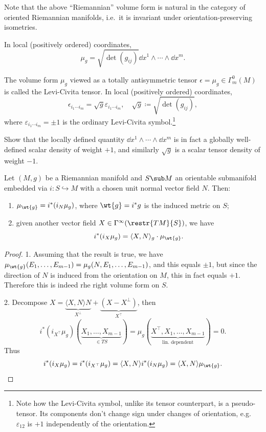 Note that the above ``Riemannian'' volume form is natural in the category of oriented Riemannian manifolds, i.e.\ it is invariant under orientation-preserving isometries.

In local (positively ordered) coordinates, \[\mu_g=\sqrt{\det(g_{ij})}\dd x^1\wedge\cdots\wedge \dd x^m.\]

\begin{defn}
    The volume form $\mu_g$ viewed as a totally antisymmetric tensor $\epsilon=\mu_g\in\Gamma^0_m(M)$ is called the Levi-Civita tensor. In local (positively ordered) coordinates,
    \[\epsilon_{i_1\cdots i_m}=\sqrt g\varepsilon_{i_1\cdots i_m},\quad \sqrt g\coloneqq\sqrt{\det(g_{ij})},\]
    where $\varepsilon_{i_1\cdots i_m}=\pm 1$ is the ordinary Levi-Civita symbol.\footnote{Note how the Levi-Civita symbol, unlike its tensor counterpart, is a pseudo-tensor. Its components don't change sign under changes of orientation, e.g. $\varepsilon_{12}$ is $+1$ independently of the orientation.}
\end{defn}

\begin{xca}
    Show that the locally defined quantity $\dd x^1\wedge\cdots \wedge\dd x^m$ is in fact a globally well-defined scalar density of weight $+1$, and similarly  $\sqrt{g}$ is a scalar tensor density of weight $-1$.
\end{xca}

\begin{prop}
    Let $(M,g)$ be a Riemannian manifold and $S\sub M$ an orientable submanifold embedded via $i:S\hookrightarrow M$ with a chosen unit normal vector field $N$. Then:
    \begin{enumerate}
        \item $\mu_{\wt{g}}=i^\ast (i_N \mu_g)$, where $\wt{g}=i^\ast g$ is the induced metric on $S$;
        \item given another vector field $X\in\Gamma^\infty(\restr{TM}{S})$, we have 
        \[i^\ast(i_X\mu_g)=\langle X,N\rangle_g \cdot \mu_{\wt{g}}.\]
    \end{enumerate}
\end{prop}
\begin{proof}
        1. Assuming that the result is true, we have $\mu_{\wt{g}}(E_1,\ldots,E_{m-1})=\mu_g(N,E_1,\ldots,E_{m-1})$, and this equals $\pm 1$, but since the direction of $N$ is induced from the orientation on $M$, this in fact equals $+1$. Therefore this is indeed rhe right volume form on $S$.
        
        2. Decompose $X=\underbrace{\langle X,N\rangle N}_{X^\perp}+\underbrace{(X-X^\perp)}_{X^\top}$,
        then 
        \[i^\ast(i_{X^\top}\mu_g)(\underbrace{X_1,\ldots,X_{m-1}}_{\in TS})=\mu_g(\underbrace{X^\top,X_1,\ldots,X_{m-1}}_{\text{lin. dependent}})=0.\]
        Thus 
        \[i^\ast(i_X\mu_g)=i^\ast(i_{X^\top}\mu_g)=\langle X,N \rangle i^\ast (i_N \mu_g)=\langle X,N\rangle \mu_{\wt{g}}.\]
\end{proof}

